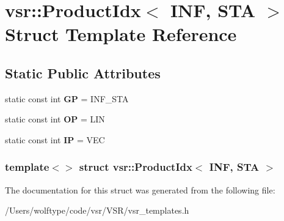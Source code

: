 \hypertarget{structvsr_1_1_product_idx_3_01_i_n_f_00_01_s_t_a_01_4}{\section{vsr\-:\-:Product\-Idx$<$ I\-N\-F, S\-T\-A $>$ Struct Template Reference}
\label{structvsr_1_1_product_idx_3_01_i_n_f_00_01_s_t_a_01_4}
}
\subsection*{Static Public Attributes}
\begin{DoxyCompactItemize}
\item 
\hypertarget{structvsr_1_1_product_idx_3_01_i_n_f_00_01_s_t_a_01_4_a2f491f0c047fd5335cf2143600a009fe}{static const int {\bfseries G\-P} = I\-N\-F\-\_\-\-S\-T\-A}\label{structvsr_1_1_product_idx_3_01_i_n_f_00_01_s_t_a_01_4_a2f491f0c047fd5335cf2143600a009fe}

\item 
\hypertarget{structvsr_1_1_product_idx_3_01_i_n_f_00_01_s_t_a_01_4_a6893f4d033da53208414f1696292decd}{static const int {\bfseries O\-P} = L\-I\-N}\label{structvsr_1_1_product_idx_3_01_i_n_f_00_01_s_t_a_01_4_a6893f4d033da53208414f1696292decd}

\item 
\hypertarget{structvsr_1_1_product_idx_3_01_i_n_f_00_01_s_t_a_01_4_ae1e574ee1eec16fd493f079253c63ada}{static const int {\bfseries I\-P} = V\-E\-C}\label{structvsr_1_1_product_idx_3_01_i_n_f_00_01_s_t_a_01_4_ae1e574ee1eec16fd493f079253c63ada}

\end{DoxyCompactItemize}
\subsubsection*{template$<$$>$ struct vsr\-::\-Product\-Idx$<$ I\-N\-F, S\-T\-A $>$}



The documentation for this struct was generated from the following file\-:\begin{DoxyCompactItemize}
\item 
/\-Users/wolftype/code/vsr/\-V\-S\-R/vsr\-\_\-templates.\-h\end{DoxyCompactItemize}
